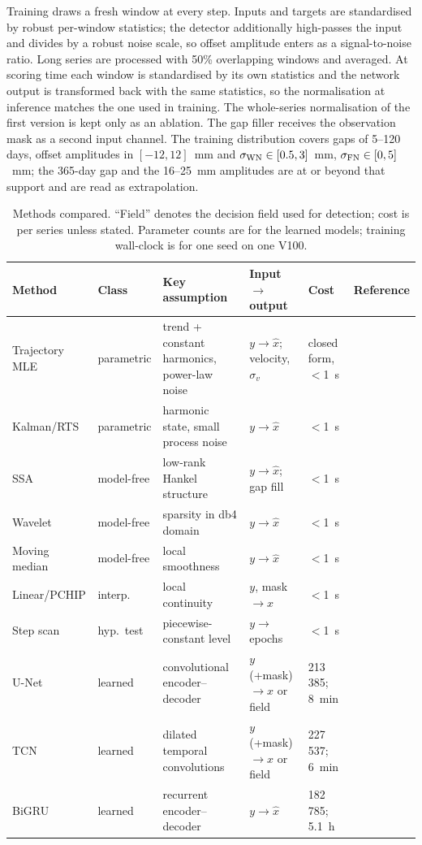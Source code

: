 Training draws a fresh window at every step. Inputs and targets are standardised
by robust per-window statistics; the detector additionally high-passes the input
and divides by a robust noise scale, so offset amplitude enters as a
signal-to-noise ratio. Long series are processed with 50\% overlapping windows
and averaged. At scoring time each window is standardised by its own statistics
and the network output is transformed back with the same statistics, so the
normalisation at inference matches the one used in training. The whole-series
normalisation of the first version is kept only as an ablation. The gap filler receives the observation mask as a second input
channel. The training distribution covers gaps of 5--120 days, offset amplitudes
in $[-12,12]$~mm and $\sigma_{\rm WN}\in[0.5,3]$~mm,
$\sigma_{\rm FN}\in[0,5]$~mm; the 365-day gap and the 16--25~mm amplitudes are at
or beyond that support and are read as extrapolation.

\begin{table}[t]
\centering
\caption{Methods compared. ``Field'' denotes the decision field used for
detection; cost is per series unless stated. Parameter counts are for the
learned models; training wall-clock is for one seed on one V100.}
\label{tab:methods}
\footnotesize
\setlength{\tabcolsep}{2.5pt}
\begin{tabularx}{\textwidth}{@{}p{2.05cm}p{1.45cm}Xp{2.2cm}p{1.4cm}p{2.0cm}@{}}
\toprule
Method & Class & Key assumption & Input $\to$ output & Cost & Reference \\
\midrule
Trajectory MLE & parametric & trend + constant harmonics, power-law noise & $y\to\hat{x}$; velocity, $\sigma_v$ & closed form, $<$1~s & \citet{williams2003coloured} \\
Kalman/RTS & parametric & harmonic state, small process noise & $y\to\hat{x}$ & $<$1~s & \\
SSA & model-free & low-rank Hankel structure & $y\to\hat{x}$; gap fill & $<$1~s & \citet{wdowinski1997spatial,ji2024ssa} \\
Wavelet & model-free & sparsity in db4 domain & $y\to\hat{x}$ & $<$1~s & \citet{ji2020wavelet} \\
Moving median & model-free & local smoothness & $y\to\hat{x}$ & $<$1~s & \\
Linear/PCHIP & interp. & local continuity & $y$, mask $\to\hat{x}$ & $<$1~s & \\
Step scan & hyp.\ test & piecewise-constant level & $y\to$ epochs & $<$1~s & \citet{gazeaux2013detecting} \\
U-Net & learned & convolutional encoder--decoder & $y$(+mask) $\to\hat{x}$ or field & 213\,385; 8~min & \citet{ronneberger2015unet} \\
TCN & learned & dilated temporal convolutions & $y$(+mask) $\to\hat{x}$ or field & 227\,537; 6~min & \citet{bai2018tcn} \\
BiGRU & learned & recurrent encoder--decoder & $y\to\hat{x}$ & 182\,785; 5.1~h & \\
\bottomrule
\end{tabularx}
\end{table}

